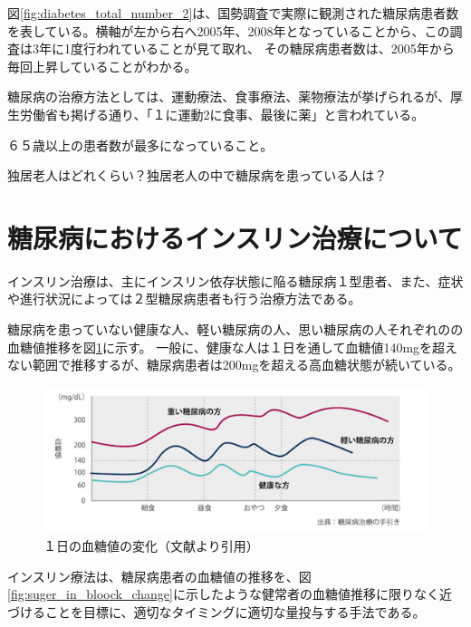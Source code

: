 図\ref{fig:diabetes_total_number_2}は、国勢調査で実際に観測された糖尿病患者数を表している。横軸が左から右へ2005年、2008年となっていることから、この調査は3年に1度行われていることが見て取れ、
その糖尿病患者数は、2005年から毎回上昇していることがわかる。

糖尿病の治療方法としては、運動療法、食事療法、薬物療法が挙げられるが、厚生労働省も掲げる通り、「１に運動2に食事、最後に薬」と言われている。

６５歳以上の患者数が最多になっていること。

独居老人はどれくらい？独居老人の中で糖尿病を患っている人は？

\newpage

\section{糖尿病におけるインスリン治療について}
\label{subsubsection:insulin_treatment}

インスリン治療は、主にインスリン依存状態に陥る糖尿病１型患者、また、症状や進行状況によっては２型糖尿病患者も行う治療方法である。\cite{insulin_treatment_method}

糖尿病を患っていない健康な人、軽い糖尿病の人、思い糖尿病の人それぞれのの血糖値推移を図\ref{fig:suger_in_blood_change}に示す。
一般に、健康な人は１日を通して血糖値140mgを超えない範囲で推移するが、糖尿病患者は200mgを超える高血糖状態が続いている。

\begin{figure}[htbp]
  \caption{１日の血糖値の変化（文献\cite{suger_in_blood_change}より引用）}
  \label{fig:suger_in_blood_change}
  \begin{center}
    \includegraphics[bb=0 0 500 200,width=15cm]{assets/suger_in_blood_change.png}
  \end{center}
\end{figure}

インスリン療法は、糖尿病患者の血糖値の推移を、図\ref{fig:suger_in_bloock_change}に示したような健常者の血糖値推移に限りなく近づけることを目標に、適切なタイミングに適切な量投与する手法である。

